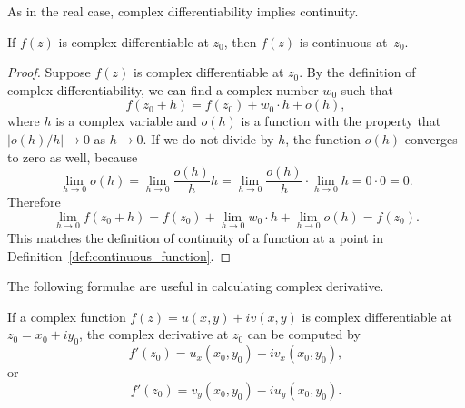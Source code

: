 As in the real case, complex differentiability implies continuity.

\begin{svgraybox}
	\begin{theorem}
		If $f(z)$ is complex differentiable at $z_0$, then $f(z)$ is continuous at~$z_0$.
	\end{theorem}
\end{svgraybox}

\begin{proof}
	Suppose $f(z)$ is complex differentiable at $z_0$. By the definition of complex differentiability, we can find a complex number $w_0$ such that 
	$$
	f(z_0+h) = f(z_0) + w_0 \cdot h + o(h), 
	$$
	where $h$ is a complex variable and $o(h)$ is a function with the property that $|o(h)/h|\rightarrow 0$ as $h\rightarrow 0$. If we do not divide by $h$, the function $o(h)$ converges to zero as well, because
	$$
	\lim_{h\rightarrow 0} o(h) = 
	\lim_{h\rightarrow 0} \frac{o(h)}{h} h = 
	\lim_{h\rightarrow 0} \frac{o(h)}{h} \cdot \lim_{h\rightarrow 0} h = 0\cdot 0=0.
	$$
	Therefore 
	$$
	\lim_{h\rightarrow 0} f(z_0+h) = f(z_0)
	+ \lim_{h\rightarrow 0} w_0 \cdot h + 
	\lim_{h\rightarrow 0} o(h) = f(z_0).
	$$
This matches the definition of continuity of a function at a point in Definition~\ref{def:continuous_function}.
\end{proof}

The following formulae are useful in calculating complex derivative.

\begin{svgraybox}
	\begin{theorem} \label{cor:CR}
		If a complex function $f(z) = u(x,y)+iv(x,y)$ is complex differentiable at $z_0 = x_0+iy_0$, the complex derivative at $z_0$ can be computed by
\begin{equation}
	f'(z_0) = 	u_x(x_0,y_0) + i v_x(x_0,y_0),
\label{eq:derivative_formula1}
\end{equation}
		or
\begin{equation}
	f'(z_0) = 	v_y(x_0,y_0) - i u_y(x_0,y_0).
\label{eq:derivative_formula2}		
\end{equation}
	\end{theorem}
\end{svgraybox}




